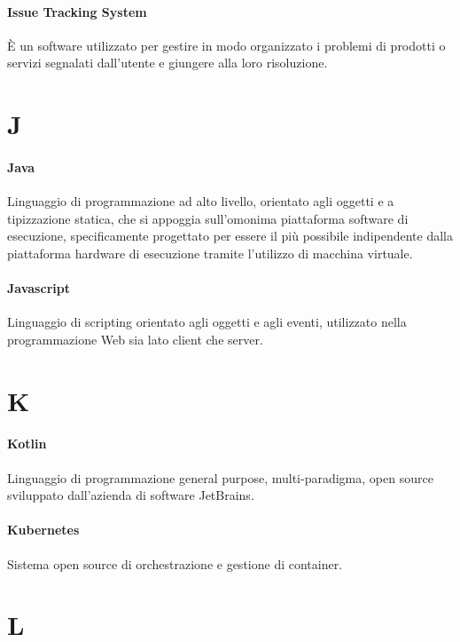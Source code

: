 \documentclass[]{article}
\begin{document}
	\paragraph*{Issue Tracking System}
	È un software utilizzato per gestire in modo organizzato i problemi di prodotti o servizi segnalati dall’utente e giungere alla loro risoluzione.
		
	\newpage
	
	\section*{J}
	
	\paragraph*{Java}
	Linguaggio di programmazione ad alto livello, orientato agli oggetti e a tipizzazione statica, che si appoggia sull'omonima piattaforma software di esecuzione, specificamente progettato per essere il più possibile indipendente dalla piattaforma hardware di esecuzione tramite l'utilizzo di macchina virtuale.
	
	\paragraph*{Javascript}
	Linguaggio di scripting orientato agli oggetti e agli eventi, utilizzato nella programmazione Web sia lato client che server.
	
	\newpage
	
	\section*{K}
	
	\paragraph*{Kotlin}
	Linguaggio di programmazione general purpose, multi-paradigma, open source sviluppato dall'azienda di software JetBrains.
	
	\paragraph*{Kubernetes}
	Sistema open source di orchestrazione e gestione di container.
	
	\newpage 
	
	\section*{L}
	
\end{document}
